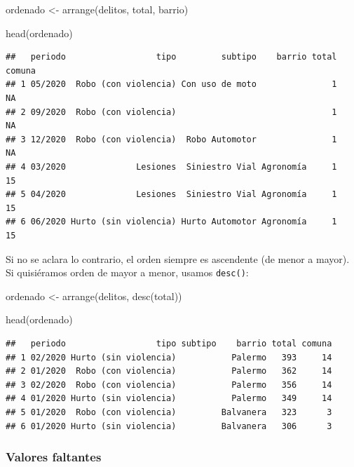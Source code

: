 \documentclass[
]{book}
\newenvironment{Shaded}{\begin{snugshade}}{\end{snugshade}}
\newcommand{\FunctionTok}[1]{\textcolor[rgb]{0.00,0.00,0.00}{#1}}
\newcommand{\NormalTok}[1]{#1}
\newcommand{\OtherTok}[1]{\textcolor[rgb]{0.56,0.35,0.01}{#1}}
\begin{document}
\begin{Shaded}
\begin{Highlighting}[]
\NormalTok{ordenado }\OtherTok{\textless{}{-}} \FunctionTok{arrange}\NormalTok{(delitos, total, barrio)}

\FunctionTok{head}\NormalTok{(ordenado)}
\end{Highlighting}
\end{Shaded}

\begin{verbatim}
##   periodo                  tipo         subtipo    barrio total comuna
## 1 05/2020  Robo (con violencia) Con uso de moto               1     NA
## 2 09/2020  Robo (con violencia)                               1     NA
## 3 12/2020  Robo (con violencia)  Robo Automotor               1     NA
## 4 03/2020              Lesiones  Siniestro Vial Agronomía     1     15
## 5 04/2020              Lesiones  Siniestro Vial Agronomía     1     15
## 6 06/2020 Hurto (sin violencia) Hurto Automotor Agronomía     1     15
\end{verbatim}

Si no se aclara lo contrario, el orden siempre es ascendente (de menor a mayor). Si quisiéramos orden de mayor a menor, usamos \texttt{desc()}:

\begin{Shaded}
\begin{Highlighting}[]
\NormalTok{ordenado }\OtherTok{\textless{}{-}} \FunctionTok{arrange}\NormalTok{(delitos, }\FunctionTok{desc}\NormalTok{(total))}

\FunctionTok{head}\NormalTok{(ordenado)}
\end{Highlighting}
\end{Shaded}

\begin{verbatim}
##   periodo                  tipo subtipo    barrio total comuna
## 1 02/2020 Hurto (sin violencia)           Palermo   393     14
## 2 01/2020  Robo (con violencia)           Palermo   362     14
## 3 02/2020  Robo (con violencia)           Palermo   356     14
## 4 01/2020 Hurto (sin violencia)           Palermo   349     14
## 5 01/2020  Robo (con violencia)         Balvanera   323      3
## 6 01/2020 Hurto (sin violencia)         Balvanera   306      3
\end{verbatim}

\hypertarget{valores-faltantes}{%
\subsubsection{Valores faltantes}\label{valores-faltantes}}
\end{document}

